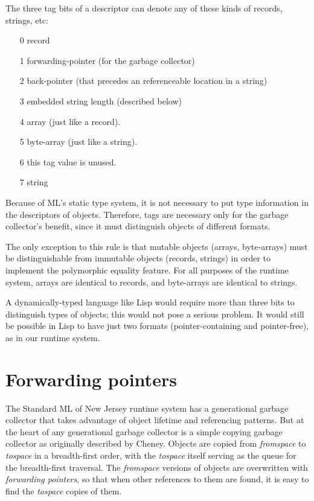 The three tag bits of a descriptor
can denote any of these kinds of records,
strings, etc:

\begin{itemize}
\item[0] record
\item[1] forwarding-pointer
(for the garbage collector)
\item[2] back-pointer (that precedes an referenceable location in a string)
\item[3] embedded string length (described below)
\item[4] array (just like a record).
\item[5] byte-array
(just like a string).
\item[6] this tag value is unused.
\item[7] string
\end{itemize}

Because of ML's static type system, it is not necessary to put type information
in the descriptors of objects.  Therefore, tags are necessary only
for the garbage collector's benefit, since it must distinguish objects of
different formats.

The only exception to this rule is that mutable objects (arrays, byte-arrays)
must be distinguishable from immutable objects (records, strings)
in order to implement the polymorphic
equality
feature.  For all purposes of the runtime system, arrays
are identical to records, and byte-arrays are identical to strings.

A dynamically-typed language like Lisp would require more than
three bits to distinguish types of objects; this would not pose a 
serious problem.  It would still be possible in Lisp to have just
two formats (pointer-containing and pointer-free), as in our runtime system.

\section{Forwarding pointers}
\label{forwarding}
The Standard ML of New Jersey runtime system has a generational garbage
collector
that takes advantage of object lifetime and referencing
patterns\cite{appel89:sggc}.
But at the heart of any generational garbage collector is a simple
copying garbage collector as originally described by Cheney\cite{cheney70}.
Objects are copied from {\em fromspace} to {\em tospace} in a breadth-first
order, with the {\em tospace} itself serving as the queue for the breadth-first
traversal.  The {\em fromspace} versions of objects are overwritten
with {\em forwarding pointers}, so that when other references to them are
found, it is easy to find the {\em tospace} copies of them.

